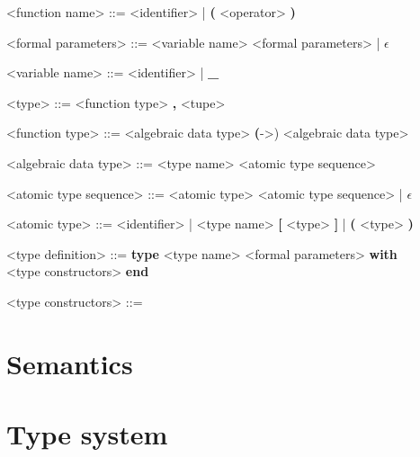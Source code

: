 \documentclass[12pt]{article}
\begin{document}
\begin{grammar}
<function name> ::= <identifier> | \textbf{(} <operator> \textbf{)}

<formal parameters> ::= <variable name> <formal parameters> |  $\epsilon$

<variable name> ::= <identifier> | \textbf{_}

<type> ::= <function type>  \textbf{,} <tupe>

<function type> ::= <algebraic data type>
     \textbf(->) <algebraic data type> 

<algebraic data type> ::= <type name> <atomic type sequence>

<atomic type sequence> ::= <atomic type> <atomic type sequence> | $\epsilon$

<atomic type> ::= <identifier> | <type name>
    \alt \textbf{[} <type> \textbf{]} | \textbf{(} <type> \textbf{)}

<type definition> ::= \textbf{type} <type name> <formal parameters> \textbf{with}\\
    <type constructors> \textbf{end}

<type constructors> ::= 

\end{grammar}

\section{Semantics}

\section{Type system}
\end{document}
